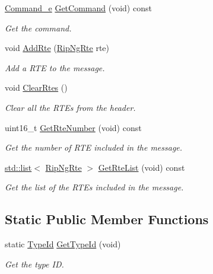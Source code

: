 \begin{DoxyCompactItemize}
\hyperlink{classns3_1_1RipNgHeader_ad96724d6f6fdb4ffa22fe71a0ff12bd2}{Command\+\_\+e} \hyperlink{classns3_1_1RipNgHeader_a991efed6322a053173ae7ee8a90a0b21}{Get\+Command} (void) const 
\begin{DoxyCompactList}\small\item\em Get the command. \end{DoxyCompactList}\item 
void \hyperlink{classns3_1_1RipNgHeader_aff4addcf8979f24166e07c5c85547e3c}{Add\+Rte} (\hyperlink{classns3_1_1RipNgRte}{Rip\+Ng\+Rte} rte)
\begin{DoxyCompactList}\small\item\em Add a R\+TE to the message. \end{DoxyCompactList}\item 
void \hyperlink{classns3_1_1RipNgHeader_a422816bd3c69a5457eba0e683de835f4}{Clear\+Rtes} ()
\begin{DoxyCompactList}\small\item\em Clear all the R\+T\+Es from the header. \end{DoxyCompactList}\item 
uint16\+\_\+t \hyperlink{classns3_1_1RipNgHeader_ae581ed086afcff1eb9d2ae9b9d581b3a}{Get\+Rte\+Number} (void) const 
\begin{DoxyCompactList}\small\item\em Get the number of R\+TE included in the message. \end{DoxyCompactList}\item 
\hyperlink{openflow-interface_8h_afd9bcfa176617760671b67580f536fa7}{std\+::list}$<$ \hyperlink{classns3_1_1RipNgRte}{Rip\+Ng\+Rte} $>$ \hyperlink{classns3_1_1RipNgHeader_ab97e746464b2d1ff94b4b438c7d5c577}{Get\+Rte\+List} (void) const 
\begin{DoxyCompactList}\small\item\em Get the list of the R\+T\+Es included in the message. \end{DoxyCompactList}\end{DoxyCompactItemize}
\subsection*{Static Public Member Functions}
\begin{DoxyCompactItemize}
\item 
static \hyperlink{classns3_1_1TypeId}{Type\+Id} \hyperlink{classns3_1_1RipNgHeader_a64ce086123668c43ce598b6e2c18e553}{Get\+Type\+Id} (void)
\begin{DoxyCompactList}\small\item\em Get the type ID. \end{DoxyCompactList}\end{DoxyCompactItemize}
